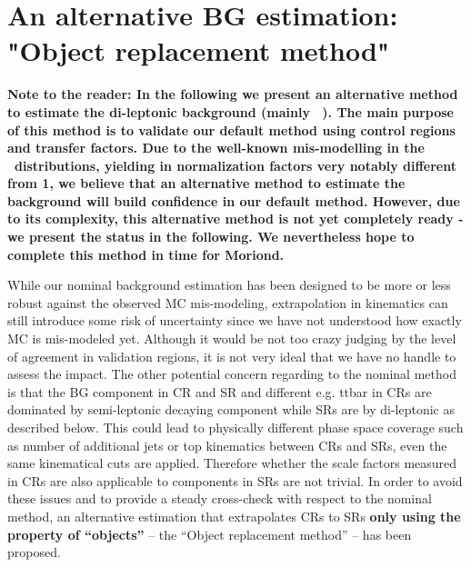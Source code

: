 \section{An alternative BG estimation: "Object replacement method"} \label{sec::ObjReplace}

\textbf{Note to the reader: In the following we present an alternative method to estimate the di-leptonic background (mainly \ttbar\ ). The main purpose of this method is to validate our default method using control regions and transfer factors. Due to the well-known mis-modelling in the \meff\ distributions, yielding in normalization factors very notably different from 1, we believe that an alternative method to estimate the background will build confidence in our default method. However, due to its complexity, this alternative method is not yet completely ready - we present the status in the following. We nevertheless hope to complete this method in time for Moriond.}

While our nominal background estimation has been designed to be more or less robust against the observed MC mis-modeling, extrapolation in kinematics can still introduce some risk of uncertainty since we have not understood how exactly MC is mis-modeled yet. Although it would be not too crazy judging by the level of agreement in validation regions, it is not very ideal that we have no handle to assess the impact. The other potential concern regarding to the nominal method is that the BG component in CR and SR and different e.g. ttbar in CRs are dominated by semi-leptonic decaying component while SRs are by di-leptonic as described below. This could lead to physically different phase space coverage such as number of additional jets or top kinematics between CRs and SRs, even the same kinematical cuts are applied. Therefore whether the scale factors measured in CRs are also applicable to components in SRs are not trivial. In order to avoid these issues and to provide a steady cross-check with respect to the nominal method, an alternative estimation that extrapolates CRs to SRs \textbf{only using the property of ``objects''} -- the ``Object replacement method'' -- has been proposed. 



